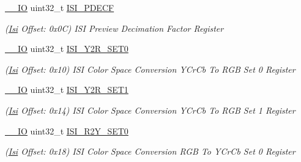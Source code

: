 \begin{DoxyCompactItemize}
\mbox{\label{structIsi_adbe66868bac8a25a210e1b38ded3a8c0}} 
\mbox{\hyperlink{core__cm7_8h_aec43007d9998a0a0e01faede4133d6be}{\+\_\+\+\_\+\+IO}} uint32\+\_\+t \mbox{\hyperlink{structIsi_adbe66868bac8a25a210e1b38ded3a8c0}{I\+S\+I\+\_\+\+P\+D\+E\+CF}}
\begin{DoxyCompactList}\small\item\em (\mbox{\hyperlink{structIsi}{Isi}} Offset\+: 0x0C) I\+SI Preview Decimation Factor Register \end{DoxyCompactList}\item 
\mbox{\label{structIsi_a45656d7621a01d162e6fb7a5a933a5af}} 
\mbox{\hyperlink{core__cm7_8h_aec43007d9998a0a0e01faede4133d6be}{\+\_\+\+\_\+\+IO}} uint32\+\_\+t \mbox{\hyperlink{structIsi_a45656d7621a01d162e6fb7a5a933a5af}{I\+S\+I\+\_\+\+Y2\+R\+\_\+\+S\+E\+T0}}
\begin{DoxyCompactList}\small\item\em (\mbox{\hyperlink{structIsi}{Isi}} Offset\+: 0x10) I\+SI Color Space Conversion Y\+Cr\+Cb To R\+GB Set 0 Register \end{DoxyCompactList}\item 
\mbox{\label{structIsi_a5c0881d73fc7a6a5a2fcde141c25a2be}} 
\mbox{\hyperlink{core__cm7_8h_aec43007d9998a0a0e01faede4133d6be}{\+\_\+\+\_\+\+IO}} uint32\+\_\+t \mbox{\hyperlink{structIsi_a5c0881d73fc7a6a5a2fcde141c25a2be}{I\+S\+I\+\_\+\+Y2\+R\+\_\+\+S\+E\+T1}}
\begin{DoxyCompactList}\small\item\em (\mbox{\hyperlink{structIsi}{Isi}} Offset\+: 0x14) I\+SI Color Space Conversion Y\+Cr\+Cb To R\+GB Set 1 Register \end{DoxyCompactList}\item 
\mbox{\label{structIsi_a90f5eef0eab2efc52311f2c41eae51a9}} 
\mbox{\hyperlink{core__cm7_8h_aec43007d9998a0a0e01faede4133d6be}{\+\_\+\+\_\+\+IO}} uint32\+\_\+t \mbox{\hyperlink{structIsi_a90f5eef0eab2efc52311f2c41eae51a9}{I\+S\+I\+\_\+\+R2\+Y\+\_\+\+S\+E\+T0}}
\begin{DoxyCompactList}\small\item\em (\mbox{\hyperlink{structIsi}{Isi}} Offset\+: 0x18) I\+SI Color Space Conversion R\+GB To Y\+Cr\+Cb Set 0 Register \end{DoxyCompactList}\item 
\mbox{\label{structIsi_a3144500899a87e48ee6cbe38a7d9d433}} 

\end{DoxyCompactItemize}
